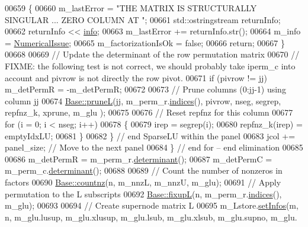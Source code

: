 \begin{DoxyCode}
00659       \{
00660         m\_lastError = \textcolor{stringliteral}{"THE MATRIX IS STRUCTURALLY SINGULAR ... ZERO COLUMN AT "};
00661         std::ostringstream returnInfo;
00662         returnInfo << \hyperlink{group___sparse_l_u___module_ab0d0c1744ffd5a1dff578a44bcef2a3d}{info}; 
00663         m\_lastError += returnInfo.str();
00664         m\_info = \hyperlink{group__enums_gga85fad7b87587764e5cf6b513a9e0ee5eaaf9b736d310a664e7729d163a035cc5f}{NumericalIssue}; 
00665         m\_factorizationIsOk = \textcolor{keyword}{false}; 
00666         \textcolor{keywordflow}{return}; 
00667       \}
00668       
00669       \textcolor{comment}{// Update the determinant of the row permutation matrix}
00670       \textcolor{comment}{// FIXME: the following test is not correct, we should probably take iperm\_c into account and pivrow
       is not directly the row pivot.}
00671       \textcolor{keywordflow}{if} (pivrow != jj) m\_detPermR = -m\_detPermR;
00672 
00673       \textcolor{comment}{// Prune columns (0:jj-1) using column jj}
00674       \hyperlink{group___sparse_l_u___module_a350464d1c83182fbd7da8a5a74bdfde8}{Base::pruneL}(jj, m\_perm\_r.\hyperlink{group___core___module_a2f1ab379207fcd1ceb33941e25cf50c2}{indices}(), pivrow, nseg, segrep, repfnz\_k, xprune, m\_glu
      ); 
00675       
00676       \textcolor{comment}{// Reset repfnz for this column }
00677       \textcolor{keywordflow}{for} (i = 0; i < nseg; i++)
00678       \{
00679         irep = segrep(i); 
00680         repfnz\_k(irep) = emptyIdxLU; 
00681       \}
00682     \} \textcolor{comment}{// end SparseLU within the panel  }
00683     jcol += panel\_size;  \textcolor{comment}{// Move to the next panel}
00684   \} \textcolor{comment}{// end for -- end elimination }
00685   
00686   m\_detPermR = m\_perm\_r.\hyperlink{group___core___module_a1fc7a5823544700c2e0795e87f9c6d09}{determinant}();
00687   m\_detPermC = m\_perm\_c.\hyperlink{group___core___module_a1fc7a5823544700c2e0795e87f9c6d09}{determinant}();
00688   
00689   \textcolor{comment}{// Count the number of nonzeros in factors }
00690   \hyperlink{group___sparse_l_u___module_acbede3f259186d48ad42ca093f80b64b}{Base::countnz}(n, m\_nnzL, m\_nnzU, m\_glu); 
00691   \textcolor{comment}{// Apply permutation  to the L subscripts }
00692   \hyperlink{group___sparse_l_u___module_ae1d1ed091956ff4e5734b4e3f79f866e}{Base::fixupL}(n, m\_perm\_r.\hyperlink{group___core___module_a2f1ab379207fcd1ceb33941e25cf50c2}{indices}(), m\_glu);
00693   
00694   \textcolor{comment}{// Create supernode matrix L }
00695   m\_Lstore.\hyperlink{group___sparse_l_u___module_af1427486564e2c75b9da68f98bd04e63}{setInfos}(m, n, m\_glu.lusup, m\_glu.xlusup, m\_glu.lsub, m\_glu.xlsub, m\_glu.supno, m\_glu.

\end{DoxyCode}
